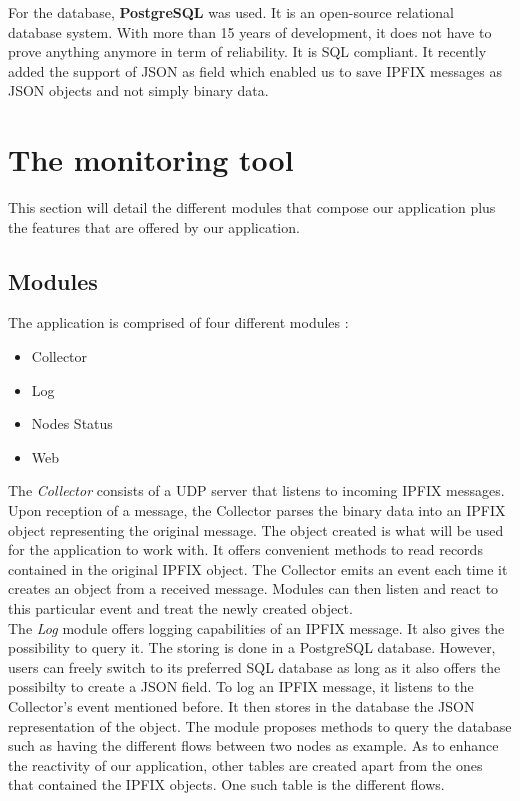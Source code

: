 For the database, \textbf{PostgreSQL} \cite{website:postgresql} was used. It is an open-source relational database system. With more than 15 years of development, it does not have to prove anything anymore in term of reliability. It is SQL compliant. It recently added the support of JSON as field which enabled us to save IPFIX messages as JSON objects and not simply binary data.

\section{The monitoring tool}

This section will detail the different modules that compose our application plus the features that are offered by our application.

\subsection{Modules}

The application is comprised of four different modules :
\begin{itemize}
	\item Collector
	\item Log
	\item Nodes Status
	\item Web \\
\end{itemize}

The \textit{Collector} consists of a UDP server that listens to incoming IPFIX messages. Upon reception of a message, the Collector parses the binary data into an IPFIX object representing the original message. The object created is what will be used for the application to work with. It offers convenient methods to read records contained in the original IPFIX object. The Collector emits an event each time it creates an object from a received message. Modules can then listen and react to this particular event and treat the newly created object. \\

The \textit{Log} module offers logging capabilities of an IPFIX message. It also gives the possibility to query it. The storing is done in a PostgreSQL database. However, users can freely switch to its preferred SQL database as long as it also offers the possibilty to create a JSON field. To log an IPFIX message, it listens to the Collector's event mentioned before. It then stores in the database the JSON representation of the object. The module proposes methods to query the database such as having the different flows between two nodes as example. As to enhance the reactivity of our application, other tables are created apart from the ones that contained the IPFIX objects. One such table is the different flows.\\

